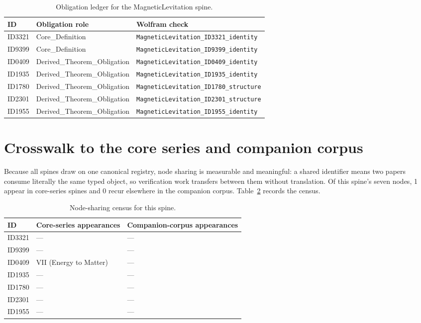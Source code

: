 \documentclass[11pt]{article}
\theoremstyle{remark}
\begin{document}
\begin{table}[ht]
\centering
\small
\caption{Obligation ledger for the MagneticLevitation spine.}
\label{tab:obligations}
\begin{tabular}{llp{6.2cm}}
\toprule
ID & Obligation role & Wolfram check \\
\midrule
ID3321 & Core\_Definition & \texttt{MagneticLevitation\_ID3321\_identity} \\
ID9399 & Core\_Definition & \texttt{MagneticLevitation\_ID9399\_identity} \\
ID0409 & Derived\_Theorem\_Obligation & \texttt{MagneticLevitation\_ID0409\_identity} \\
ID1935 & Derived\_Theorem\_Obligation & \texttt{MagneticLevitation\_ID1935\_identity} \\
ID1780 & Derived\_Theorem\_Obligation & \texttt{MagneticLevitation\_ID1780\_structure} \\
ID2301 & Derived\_Theorem\_Obligation & \texttt{MagneticLevitation\_ID2301\_structure} \\
ID1955 & Derived\_Theorem\_Obligation & \texttt{MagneticLevitation\_ID1955\_identity} \\
\bottomrule
\end{tabular}
\end{table}

\section{Crosswalk to the core series and companion corpus}
\label{sec:crosswalk}

Because all spines draw on one canonical registry, node sharing is measurable and meaningful: a shared identifier means two papers consume literally the same typed object, so verification work transfers between them without translation. Of this spine's seven nodes, 1 appear in core-series spines and 0 recur elsewhere in the companion corpus. Table~\ref{tab:crosswalk} records the census.

\begin{table}[ht]
\centering
\small
\caption{Node-sharing census for this spine.}
\label{tab:crosswalk}
\begin{tabular}{lp{4.4cm}p{6.6cm}}
\toprule
ID & Core-series appearances & Companion-corpus appearances \\
\midrule
ID3321 & --- & --- \\
ID9399 & --- & --- \\
ID0409 & VII (Energy to Matter) & --- \\
ID1935 & --- & --- \\
ID1780 & --- & --- \\
ID2301 & --- & --- \\
ID1955 & --- & --- \\
\bottomrule
\end{tabular}
\end{table}
\end{document}
